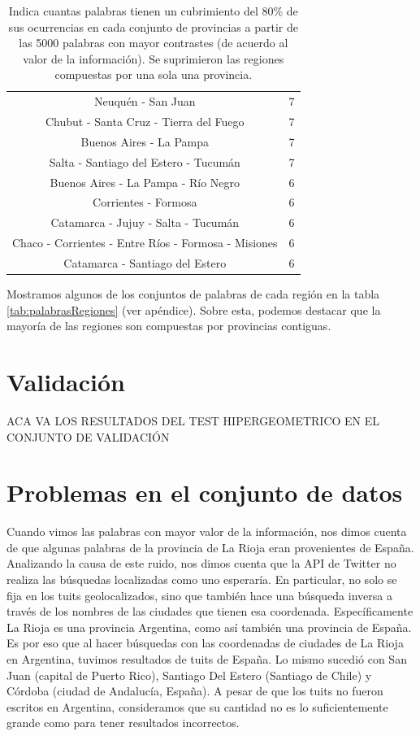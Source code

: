 \begin{table}
\begin{tabular}{|c|c|}
Neuquén - San Juan                                    & 7           \\ %
Chubut - Santa Cruz - Tierra del Fuego                 & 7           \\
Buenos Aires - La Pampa                                & 7           \\
Salta - Santiago del Estero - Tucumán                  & 7           \\
Buenos Aires - La Pampa - Río Negro                     & 6           \\
Corrientes - Formosa                                  & 6           \\
Catamarca - Jujuy - Salta - Tucumán                     & 6           \\
Chaco - Corrientes - Entre Ríos - Formosa - Misiones     & 6           \\
Catamarca - Santiago del Estero                       & 6           \\
\hline
\end{tabular}
\caption{Indica cuantas palabras tienen un cubrimiento del 80\% de sus ocurrencias en cada conjunto de provincias a partir de las 5000 palabras con mayor contrastes (de acuerdo al valor de la información). Se suprimieron las regiones compuestas por una sola una provincia.}
\label{tab:regiones}
\end{table}

Mostramos algunos de los conjuntos de palabras de cada región en la tabla \ref{tab:palabrasRegiones} (ver apéndice). Sobre esta, podemos destacar que la mayoría de las regiones son compuestas por provincias contiguas.


\section{Validación}
ACA VA LOS RESULTADOS DEL TEST HIPERGEOMETRICO EN EL CONJUNTO DE VALIDACIÓN

\section{Problemas en el conjunto de datos}
\label{problemas_datos}

Cuando vimos las palabras con mayor valor de la información, nos dimos cuenta de que algunas palabras de la provincia de La Rioja eran provenientes de España. Analizando la causa de este ruido, nos dimos cuenta que la API de Twitter no realiza las búsquedas localizadas como uno esperaría. En particular, no solo se fija en los tuits geolocalizados, sino que también hace una búsqueda inversa a través de los nombres de las ciudades que tienen esa coordenada. Específicamente La Rioja es una provincia Argentina, como así también una provincia de España. Es por eso que al hacer búsquedas con las coordenadas de ciudades de La Rioja en Argentina, tuvimos resultados de tuits de España. Lo mismo sucedió con San Juan (capital de Puerto Rico), Santiago Del Estero (Santiago de Chile) y Córdoba (ciudad de Andalucía, España). A pesar de que los tuits no fueron escritos en Argentina, consideramos que su cantidad no es lo suficientemente grande como para tener resultados incorrectos.

